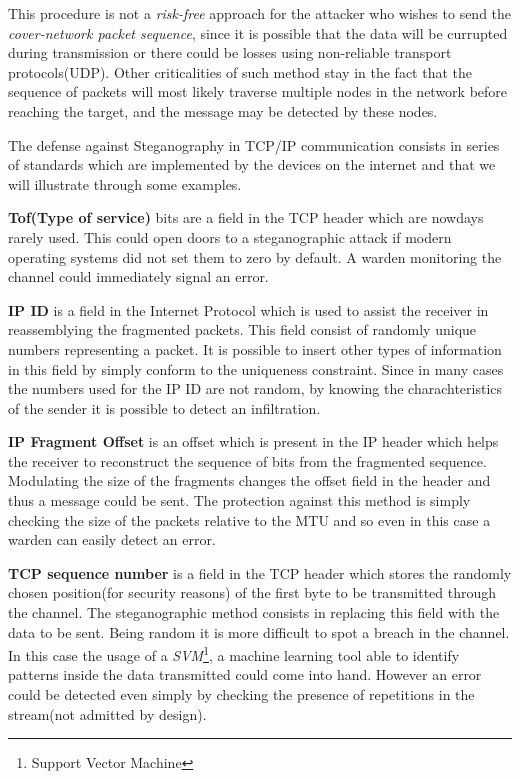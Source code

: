 \documentclass[../../main.tex]{subfiles}
\begin{document}
    This procedure is not a \emph{risk-free} approach for the attacker who
    wishes to send the \emph{cover-network packet sequence}, since it is
    possible that the data will be currupted during transmission or there could
    be losses using non-reliable transport protocols(UDP).
    Other criticalities of such method stay in the fact that the sequence of
    packets will most likely traverse multiple nodes in the network before
    reaching the target, and the message may be detected by these nodes.

    The defense against Steganography in TCP/IP communication consists in 
    series of standards which are implemented by the devices on the internet and
    that we will illustrate through some examples.


    \textbf{Tof(Type of service)} bits are a field in the TCP header which are
    nowdays rarely used. This could open doors to a steganographic attack if
    modern operating systems did not set them to zero by default.
    A warden monitoring the channel could immediately signal an error.

    \textbf{IP ID} is a field in the Internet Protocol which is used to assist
    the receiver in reassemblying the fragmented packets.
    This field consist of randomly unique numbers representing a packet.
    It is possible to insert other types of information in this field by simply
    conform to the uniqueness constraint.
    Since in many cases the numbers used for the IP ID are not random, by
    knowing the charachteristics of the sender it is possible to detect an
    infiltration.

    \textbf{IP Fragment Offset} is an offset which is present in the IP header
    which helps the receiver to reconstruct the sequence of bits from the
    fragmented sequence.
    Modulating the size of the fragments changes the offset field in the header
    and thus a message could be sent.
    The protection against this method is simply checking the size of the
    packets relative to the MTU and so even in this case a warden can easily
    detect an error.

    \textbf{TCP sequence number} is a field in the TCP header which stores the
    randomly chosen position(for security reasons) of the first byte to be
    transmitted through the channel. The steganographic method consists in
    replacing this field with the data to be sent.
    Being random it is more difficult to spot a breach in the channel.
    In this case the usage of a \emph{SVM}\footnote{Support Vector Machine}, a
    machine learning tool able to identify patterns inside the data transmitted
    could come into hand.
    However an error could be detected even simply by checking the presence of
    repetitions in the stream(not admitted by design). 
\end{document}
